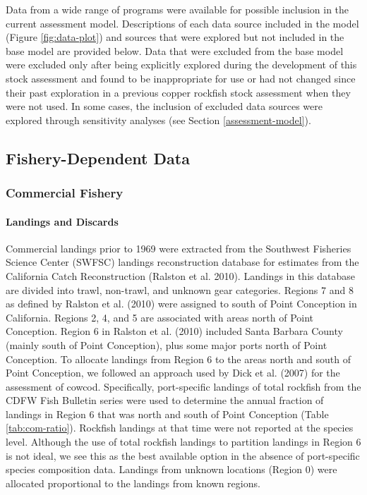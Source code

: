 \documentclass[11pt,
  english,
  letterpaper,
]{article}
\begin{document}
Data from a wide range of programs were available for possible inclusion in the current assessment model. Descriptions of each data source included in the model (Figure \ref{fig:data-plot}) and sources that were explored but not included in the base model are provided below. Data that were excluded from the base model were excluded only after being explicitly explored during the development of this stock assessment and found to be inappropriate for use or had not changed since their past exploration in a previous copper rockfish stock assessment when they were not used. In some cases, the inclusion of excluded data sources were explored through sensitivity analyses (see Section \ref{assessment-model}).

\hypertarget{fishery-dependent-data}{%
\subsection{Fishery-Dependent Data}\label{fishery-dependent-data}}

\hypertarget{commercial-fishery}{%
\subsubsection{Commercial Fishery}\label{commercial-fishery}}

\hypertarget{landings-and-discards}{%
\paragraph{Landings and Discards}\label{landings-and-discards}}

\hfill\break

Commercial landings prior to 1969 were extracted from the Southwest Fisheries Science Center (SWFSC) landings reconstruction database for estimates from the California Catch Reconstruction (Ralston et al. 2010). Landings in this database are divided into trawl, non-trawl, and unknown gear categories. Regions 7 and 8 as defined by Ralston et al. (2010) were assigned to south of Point Conception in California. Regions 2, 4, and 5 are associated with areas north of Point Conception. Region 6 in Ralston et al. (2010) included Santa Barbara County (mainly south of Point Conception), plus some major ports north of Point Conception. To allocate landings from Region 6 to the areas north and south of Point Conception, we followed an approach used by Dick et al. (2007) for the assessment of cowcod. Specifically, port-specific landings of total rockfish from the CDFW Fish Bulletin series were used to determine the annual fraction of landings in Region 6 that was north and south of Point Conception (Table \ref{tab:com-ratio}). Rockfish landings at that time were not reported at the species level. Although the use of total rockfish landings to partition landings in Region 6 is not ideal, we see this as the best available option in the absence of port-specific species composition data. Landings from unknown locations (Region 0) were allocated proportional to the landings from known regions.
\end{document}
